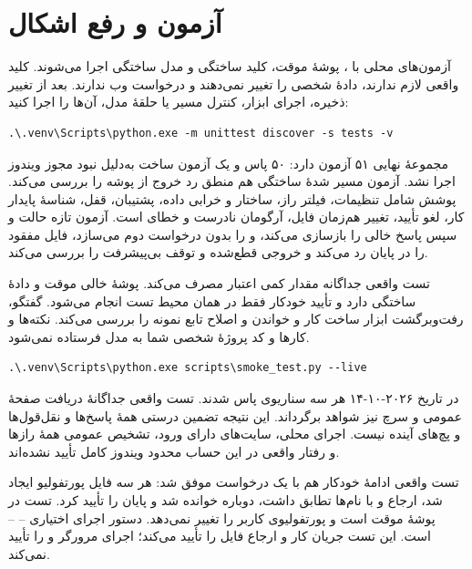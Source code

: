 \chapter{آزمون و رفع اشکال}

آزمون‌های محلی با 
، پوشهٔ موقت، کلید ساختگی و مدل ساختگی اجرا می‌شوند. کلید واقعی لازم ندارند، دادهٔ شخصی را تغییر نمی‌دهند و درخواست وب ندارند. بعد از تغییر ذخیره، اجرای ابزار، کنترل مسیر یا حلقهٔ مدل، آن‌ها را اجرا کنید:

\begin{LTR}
\begin{Verbatim}[breaklines,breakanywhere,fontsize=\small]
.\.venv\Scripts\python.exe -m unittest discover -s tests -v
\end{Verbatim}
\end{LTR}

مجموعهٔ نهایی ۵۱ آزمون دارد: ۵۰ پاس و یک آزمون ساخت 
 به‌دلیل نبود مجوز ویندوز اجرا نشد. آزمون مسیر 
شدهٔ ساختگی هم منطق رد خروج از پوشه را بررسی می‌کند. پوشش شامل تنظیمات، فیلتر راز، ساختار و خرابی داده، پشتیبان، قفل، شناسهٔ پایدار کار، لغو تأیید، تغییر هم‌زمان فایل، آرگومان نادرست و خطای 
 است. آزمون تازه حالت 
 و سپس پاسخ خالی را بازسازی می‌کند، 
 و 
 را بدون درخواست دوم می‌سازد، فایل مفقود را در پایان رد می‌کند و خروجی قطع‌شده و توقف بی‌پیشرفت را بررسی می‌کند.

تست واقعی جداگانه مقدار کمی اعتبار 
 مصرف می‌کند. پوشهٔ خالی موقت و دادهٔ ساختگی دارد و تأیید خودکار فقط در همان محیط تست انجام می‌شود. گفتگو، رفت‌وبرگشت ابزار ساخت کار و خواندن و اصلاح تابع نمونه را بررسی می‌کند. نکته‌ها و کارها و کد پروژهٔ شخصی شما به مدل فرستاده نمی‌شود.

\begin{LTR}
\begin{Verbatim}[breaklines,breakanywhere,fontsize=\small]
.\.venv\Scripts\python.exe scripts\smoke_test.py --live
\end{Verbatim}
\end{LTR}

در تاریخ ۲۰۲۶-۱۰-۱۴ هر سه سناریوی 
 پاس شدند. تست واقعی جداگانهٔ دریافت صفحهٔ عمومی و سرچ نیز 
 شواهد برگرداند. این نتیجه تضمین درستی همهٔ پاسخ‌ها و نقل‌قول‌ها و پچ‌های آینده نیست. اجرای محلی، سایت‌های دارای ورود، تشخیص عمومی همهٔ رازها و رفتار واقعی 
 در این حساب محدود ویندوز کامل تأیید نشده‌اند.

تست واقعی ادامهٔ خودکار هم با یک درخواست موفق شد: هر سه فایل پورتفولیو ایجاد شد، ارجاع 
 و 
 با نام‌ها تطابق داشت، 
 دوباره خوانده شد و 
 پایان را تأیید کرد. تست در پوشهٔ موقت است و پورتفولیوی کاربر را تغییر نمی‌دهد. دستور اجرای اختیاری 
 --
 --
 است. این تست جریان کار و ارجاع فایل را تأیید می‌کند؛ اجرای مرورگر و 
 را تأیید نمی‌کند.

